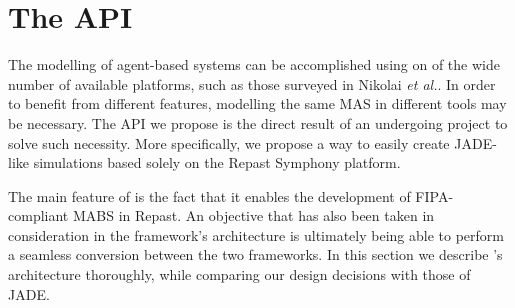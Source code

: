 \section{The \apiname{} API} %
\label{sec:proposal}

The modelling of agent-based systems can be accomplished using on of the wide number of available platforms, such as those surveyed in Nikolai \emph{et al.}\cite{survey}. In order to benefit from different features, modelling the same MAS in different tools may be necessary.
The API we propose is the direct result of an undergoing project to solve such necessity. More specifically, we propose a way to easily create JADE-like simulations based solely on the Repast Symphony platform.

The main feature of \apiname{} is the fact that it enables the development of FIPA-compliant MABS in Repast.
An objective that has also been taken in consideration in the framework's architecture is ultimately being able to perform a seamless conversion between the two frameworks.
In this section we describe \apiname{}'s architecture thoroughly, while comparing our design decisions with those of JADE.





